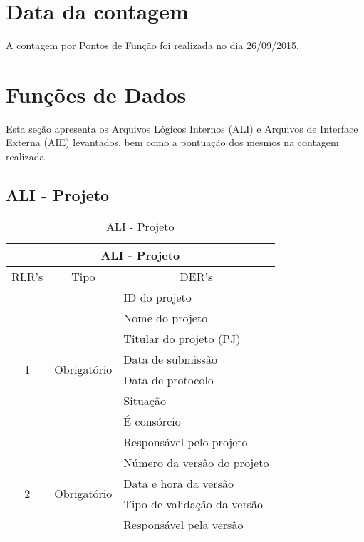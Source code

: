 \section{Data da contagem}

  A contagem por Pontos de Função foi realizada no dia 26/09/2015.

\section{Funções de Dados}

Esta seção apresenta os Arquivos Lógicos Internos (ALI) e Arquivos de Interface Externa (AIE) levantados, bem como a 
pontuação dos mesmos na contagem realizada.

  \subsection{ALI - Projeto}
  
      \begin{table}[!h]
      \centering
      \caption{ALI - Projeto}
      \label{ali_projeto}
      \begin{tabular}{|c|c|l|}
      \hline
      \multicolumn{3}{|c|}{\textbf{ALI - Projeto}}                                                      \\ \hline
      \multicolumn{1}{|l|}{RLR's} & Tipo                         & \multicolumn{1}{c|}{DER's}  \\ \hline
      \multirow{8}{*}{1}          & \multirow{8}{*}{Obrigatório} & ID do projeto               \\ \cline{3-3} 
				  &                              & Nome do projeto             \\ \cline{3-3} 
				  &                              & Titular do projeto (PJ)     \\ \cline{3-3} 
				  &                              & Data de submissão           \\ \cline{3-3} 
				  &                              & Data de protocolo           \\ \cline{3-3} 
				  &                              & Situação                    \\ \cline{3-3} 
				  &                              & É consórcio                 \\ \cline{3-3} 
				  &                              & Responsável pelo projeto    \\ \hline
      \multirow{4}{*}{2}        & \multirow{4}{*}{Obrigatório} & Número da versão do projeto \\ \cline{3-3} 
				  &                              & Data e hora da versão       \\ \cline{3-3} 
				  &                              & Tipo de validação da versão \\ \cline{3-3} 
				  &                              & Responsável pela versão     \\ \hline
      \end{tabular}
      \end{table}
  
